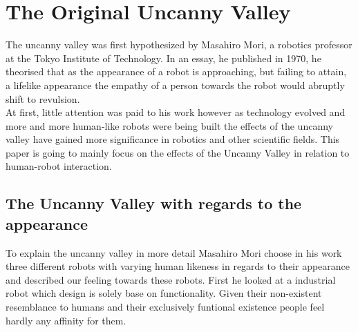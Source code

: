 \chapter{The Original Uncanny Valley}

The uncanny valley was first hypothesized by Masahiro Mori, a robotics professor at the
Tokyo Institute of Technology. In an essay, he published in 1970, he theorised that as the appearance of a robot 
is approaching, but failing to attain, a lifelike appearance the empathy of a person towards the robot would 
abruptly shift to revulsion.\\
At first, little attention was paid to his work however as technology evolved and more and more human-like robots were being
built the effects of the uncanny valley have gained more significance in robotics and other scientific fields. 
This paper is going to mainly focus on the effects of the Uncanny Valley in relation to human-robot interaction.\cite{6213238}

\section{The Uncanny Valley with regards to the appearance}
To explain the uncanny valley in more detail Masahiro Mori choose in his work three different robots with varying human 
likeness in regards to their appearance and described our feeling towards these robots. First he looked at a industrial robot
which design is solely base on functionality. Given their non-existent resemblance to humans and their exclusively funtional
existence people feel hardly any affinity for them.\\
